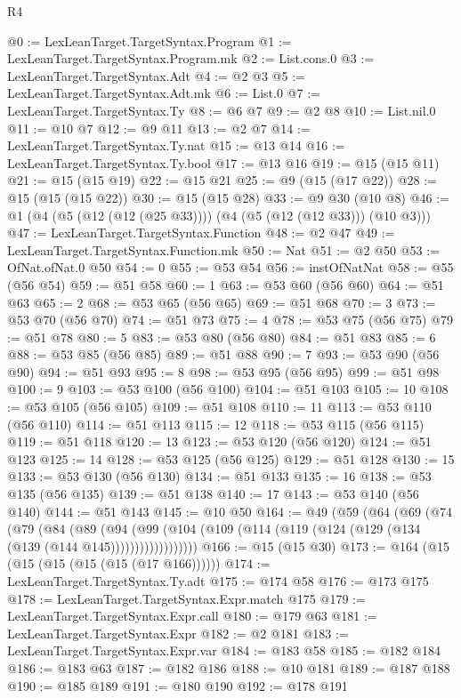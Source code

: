 \begin{lexlean}{R4}
\begin{coremodule}
@0 := LexLeanTarget.TargetSyntax.Program
@1 := LexLeanTarget.TargetSyntax.Program.mk
@2 := List.cons.{0}
@3 := LexLeanTarget.TargetSyntax.Adt
@4 := @2 @3
@5 := LexLeanTarget.TargetSyntax.Adt.mk
@6 := List.{0}
@7 := LexLeanTarget.TargetSyntax.Ty
@8 := @6 @7
@9 := @2 @8
@10 := List.nil.{0}
@11 := @10 @7
@12 := @9 @11
@13 := @2 @7
@14 := LexLeanTarget.TargetSyntax.Ty.nat
@15 := @13 @14
@16 := LexLeanTarget.TargetSyntax.Ty.bool
@17 := @13 @16
@19 := @15 (@15 @11)
@21 := @15 (@15 @19)
@22 := @15 @21
@25 := @9 (@15 (@17 @22))
@28 := @15 (@15 (@15 @22))
@30 := @15 (@15 @28)
@33 := @9 @30 (@10 @8)
@46 := @1 (@4 (@5 (@12 (@12 (@25 @33)))) (@4 (@5 (@12 (@12 @33))) (@10 @3)))
@47 := LexLeanTarget.TargetSyntax.Function
@48 := @2 @47
@49 := LexLeanTarget.TargetSyntax.Function.mk
@50 := Nat
@51 := @2 @50
@53 := OfNat.ofNat.{0} @50
@54 := 0
@55 := @53 @54
@56 := instOfNatNat
@58 := @55 (@56 @54)
@59 := @51 @58
@60 := 1
@63 := @53 @60 (@56 @60)
@64 := @51 @63
@65 := 2
@68 := @53 @65 (@56 @65)
@69 := @51 @68
@70 := 3
@73 := @53 @70 (@56 @70)
@74 := @51 @73
@75 := 4
@78 := @53 @75 (@56 @75)
@79 := @51 @78
@80 := 5
@83 := @53 @80 (@56 @80)
@84 := @51 @83
@85 := 6
@88 := @53 @85 (@56 @85)
@89 := @51 @88
@90 := 7
@93 := @53 @90 (@56 @90)
@94 := @51 @93
@95 := 8
@98 := @53 @95 (@56 @95)
@99 := @51 @98
@100 := 9
@103 := @53 @100 (@56 @100)
@104 := @51 @103
@105 := 10
@108 := @53 @105 (@56 @105)
@109 := @51 @108
@110 := 11
@113 := @53 @110 (@56 @110)
@114 := @51 @113
@115 := 12
@118 := @53 @115 (@56 @115)
@119 := @51 @118
@120 := 13
@123 := @53 @120 (@56 @120)
@124 := @51 @123
@125 := 14
@128 := @53 @125 (@56 @125)
@129 := @51 @128
@130 := 15
@133 := @53 @130 (@56 @130)
@134 := @51 @133
@135 := 16
@138 := @53 @135 (@56 @135)
@139 := @51 @138
@140 := 17
@143 := @53 @140 (@56 @140)
@144 := @51 @143
@145 := @10 @50
@164 := @49
    (@59
      (@64
        (@69
          (@74
            (@79
              (@84
                (@89
                  (@94
                    (@99
                      (@104 (@109 (@114 (@119 (@124 (@129 (@134 (@139 (@144 @145))))))))))))))))))
@166 := @15 (@15 @30)
@173 := @164 (@15 (@15 (@15 (@15 (@15 (@17 @166))))))
@174 := LexLeanTarget.TargetSyntax.Ty.adt
@175 := @174 @58
@176 := @173 @175
@178 := LexLeanTarget.TargetSyntax.Expr.match @175
@179 := LexLeanTarget.TargetSyntax.Expr.call
@180 := @179 @63
@181 := LexLeanTarget.TargetSyntax.Expr
@182 := @2 @181
@183 := LexLeanTarget.TargetSyntax.Expr.var
@184 := @183 @58
@185 := @182 @184
@186 := @183 @63
@187 := @182 @186
@188 := @10 @181
@189 := @187 @188
@190 := @185 @189
@191 := @180 @190
@192 := @178 @191

\end{coremodule}
\end{lexlean}
